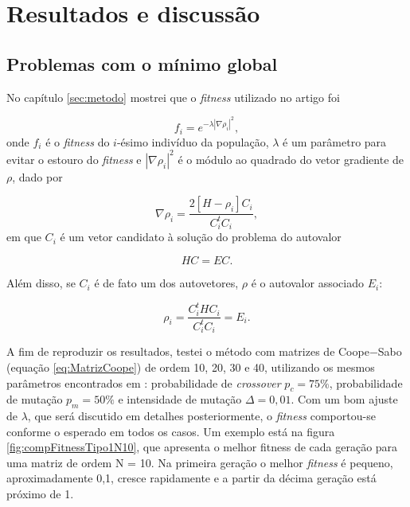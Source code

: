 \chapter{Resultados e discussão}
\label{cap:resultados}

\section{Problemas com o mínimo global}	
	
	No capítulo \ref{sec:metodo} mostrei que o \textit{fitness} utilizado no artigo \cite{metodo2004}  foi
	
	\begin{equation}
		\label{eq:fitnessGrad2}
		f_i = e^{-\lambda |\nabla \rho_i|^2},
	\end{equation}
	onde $f_i$ é o \textit{fitness} do $i$-ésimo indivíduo da população, $\lambda$ é um parâmetro para evitar o estouro do \textit{fitness} e $| \nabla \rho_i|^2$ é o módulo ao quadrado do vetor gradiente de $\rho$, dado por
		
				\begin{equation}
					\nabla \rho_i = \frac{2[H - \rho_i]C_i}{C_i^t C_i},
				\end{equation}
	em que $C_i$ é um vetor candidato à solução do problema do autovalor
	
	\begin{equation}
		HC = EC.
	\end{equation}
	
	Além disso, se $C_i$ é de fato um dos autovetores, $\rho$ é o autovalor associado $E_i$:
	
	\begin{equation}\label{eq:rho_eh_E}
		\rho_i = \frac{C_i^t H C_i}{C_i^t C_i} = E_i.
	\end{equation}
	
	A fim de reproduzir os resultados, testei o método com matrizes de Coope$-$Sabo (equação \ref{eq:MatrizCoope}) de ordem 10, 20, 30 e 40, utilizando os mesmos parâmetros encontrados em \cite{metodo2004}: probabilidade de \textit{crossover} $p_c = 75\%$, probabilidade de mutação $p_m = 50\%$ e intensidade de mutação $\Delta = 0,01$. Com um bom ajuste de $\lambda$, que será discutido em detalhes posteriormente, o \textit{fitness} comportou-se conforme o esperado em todos os casos. Um exemplo está na figura \ref{fig:compFitnessTipo1N10}, que apresenta o melhor fitness de cada geração para uma matriz de ordem N = 10. Na primeira geração o melhor \textit{fitness} é pequeno, aproximadamente 0,1, cresce rapidamente e a partir da décima geração está próximo de 1.
	
